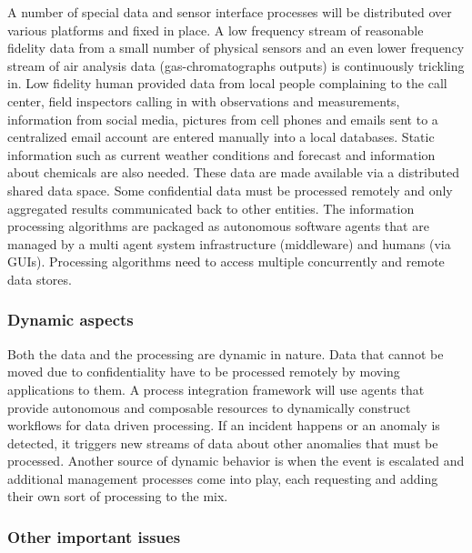 A number of special data and sensor interface processes will be distributed over various platforms
and fixed in place.  A low frequency stream of reasonable fidelity data from a small number of
physical sensors and an even lower frequency stream of air analysis data (gas-chromatographs
outputs) is continuously trickling in.  Low fidelity human provided data from local people complaining to the call center,
field inspectors calling in with observations and measurements, information from
social media, pictures from cell phones and emails sent to a centralized email account are entered manually into a local databases.  Static information such as current
weather conditions and forecast and information about chemicals are also needed.  These data are
made available via a distributed shared data space.  Some confidential data must be processed remotely and only aggregated results communicated back to other entities. The information processing algorithms are packaged as autonomous software agents that are managed by a multi agent system infrastructure
(middleware) and humans (via GUIs). Processing algorithms need to access multiple concurrently and remote data stores.

 \subsubsection*{Dynamic aspects}



Both the data and the processing are dynamic in nature. Data that cannot be moved due to
confidentiality have to be processed remotely by moving applications to them.  A process integration
framework will use agents that provide autonomous and composable resources to dynamically construct
workflows for data driven processing.  If an incident happens or an anomaly is detected, it triggers
new streams of data about other anomalies that must be processed.  Another source of dynamic
behavior is when the event is escalated and additional management processes come into play, each
requesting and adding their own sort of processing to the mix.

 \subsubsection*{Other important issues}




